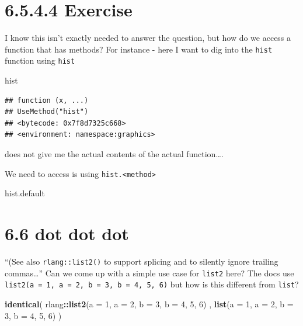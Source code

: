 \documentclass[]{book}
\newenvironment{Shaded}{\begin{snugshade}}{\end{snugshade}}
\newcommand{\DataTypeTok}[1]{\textcolor[rgb]{0.13,0.29,0.53}{#1}}
\newcommand{\DecValTok}[1]{\textcolor[rgb]{0.00,0.00,0.81}{#1}}
\newcommand{\KeywordTok}[1]{\textcolor[rgb]{0.13,0.29,0.53}{\textbf{#1}}}
\newcommand{\NormalTok}[1]{#1}
\newcommand{\OperatorTok}[1]{\textcolor[rgb]{0.81,0.36,0.00}{\textbf{#1}}}
\begin{document}
\hypertarget{exercise-3}{%
\section*{6.5.4.4 Exercise}\label{exercise-3}}

I know this isn't exactly needed to answer the question, but how do we access a function that has methods? For instance - here I want to dig into the \texttt{hist} function using \texttt{hist}

\begin{Shaded}
\begin{Highlighting}[]
\NormalTok{hist}
\end{Highlighting}
\end{Shaded}

\begin{verbatim}
## function (x, ...) 
## UseMethod("hist")
## <bytecode: 0x7f8d7325c668>
## <environment: namespace:graphics>
\end{verbatim}

does not give me the actual contents of the actual function\ldots{}.

We need to access is using \texttt{hist.\textless{}method\textgreater{}}

\begin{Shaded}
\begin{Highlighting}[]
\NormalTok{hist.default}
\end{Highlighting}
\end{Shaded}

\hypertarget{dot-dot-dot}{%
\section*{6.6 dot dot dot}\label{dot-dot-dot}}

``(See also \texttt{rlang::list2()} to support splicing and to silently ignore trailing commas\ldots{}'' Can we come up with a simple use case for \texttt{list2} here? The docs use \texttt{list2(a\ =\ 1,\ a\ =\ 2,\ b\ =\ 3,\ b\ =\ 4,\ 5,\ 6)} but how is this different from \texttt{list}?

\begin{Shaded}
\begin{Highlighting}[]
\KeywordTok{identical}\NormalTok{(}
\NormalTok{  rlang}\OperatorTok{::}\KeywordTok{list2}\NormalTok{(}\DataTypeTok{a =} \DecValTok{1}\NormalTok{, }\DataTypeTok{a =} \DecValTok{2}\NormalTok{, }\DataTypeTok{b =} \DecValTok{3}\NormalTok{, }\DataTypeTok{b =} \DecValTok{4}\NormalTok{, }\DecValTok{5}\NormalTok{, }\DecValTok{6}\NormalTok{) ,}
  \KeywordTok{list}\NormalTok{(}\DataTypeTok{a =} \DecValTok{1}\NormalTok{, }\DataTypeTok{a =} \DecValTok{2}\NormalTok{, }\DataTypeTok{b =} \DecValTok{3}\NormalTok{, }\DataTypeTok{b =} \DecValTok{4}\NormalTok{, }\DecValTok{5}\NormalTok{, }\DecValTok{6}\NormalTok{)}
\NormalTok{)}
\end{Highlighting}
\end{Shaded}
\end{document}
